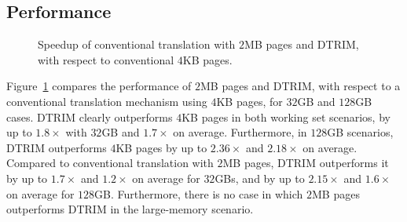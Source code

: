 \subsection{Performance}
\begin{figure}[t]
	\centering

	\caption{Speedup of conventional translation with $2$MB pages and DTRIM, with respect to conventional $4$KB pages.
		\label{fig:perf}}
\end{figure}
Figure~\ref{fig:perf} compares the performance of $2$MB pages and DTRIM, with respect to a conventional translation mechanism using $4$KB pages, for $32$GB and $128$GB cases. DTRIM clearly outperforms $4$KB pages in both working set scenarios, by up to $1.8\times$ with $32$GB and $1.7\times$ on average. Furthermore, in $128$GB scenarios, DTRIM outperforms $4$KB pages by up to $2.36\times$ and $2.18\times$ on average. Compared to conventional translation with $2$MB pages, DTRIM outperforms it by up to $1.7\times$ and $1.2\times$ on average for $32$GBs, and by up to $2.15\times$ and $1.6\times$ on average for $128$GB. Furthermore, there is no case in which $2$MB pages outperforms DTRIM in the large-memory scenario.

